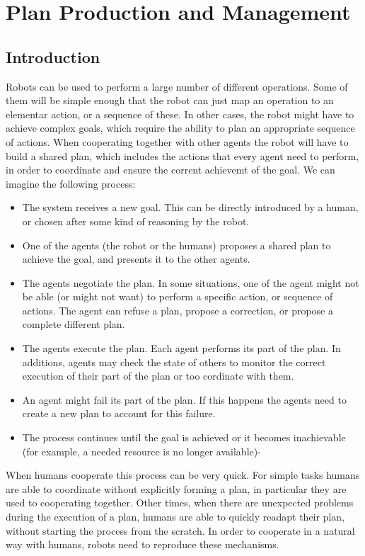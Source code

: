 
\chapter{Plan Production and Management} %

\label{chapter-plan production and management} %



\section{Introduction}
Robots can be used to perform a large number of different operations. Some of them will be simple enough that the robot can just map an operation to an elementar action, or a sequence of these. In other cases, the robot might have to  achieve complex goals, which require the ability to plan an appropriate sequence of actions. When cooperating together with other agents the robot will have to build a shared plan, which includes the actions that every agent need to perform, in order to coordinate and ensure the corrent achievemt of the goal. We can imagine the following process:
\begin{itemize}
	\item The system receives a new goal. This can be directly introduced by a human, or chosen after some kind of reasoning by the robot.
	\item One of the agents (the robot or the humans) proposes a shared plan to achieve the goal, and presents it to the other agents.
	\item The agents negotiate the plan. In some situations, one of the agent might not be able (or might not want) to perform a specific action, or sequence of actions. The agent can refuse a plan, propose a correction, or propose a complete different plan.
	\item The agents execute the plan. Each agent performs its part of the plan. In additions, agents may check the state of others to monitor the correct execution of their part of the plan or too cordinate with them.
	\item An agent might fail its part of the plan. If this happens the agents need to create a new plan to account for this failure.
 	\item The process continues until the goal is achieved or it becomes inachievable (for example, a needed resource is no longer available)-
\end{itemize} 
When humans cooperate this process can be very quick. For simple tasks humans are able to coordinate without explicitly forming a plan, in particular they are used to cooperating together. Other times, when there are unexpected problems during the execution of a plan, humans are able to quickly readapt their plan, without starting the process from the scratch. In order to cooperate in a natural way with humans, robots need to reproduce these mechanisms.


